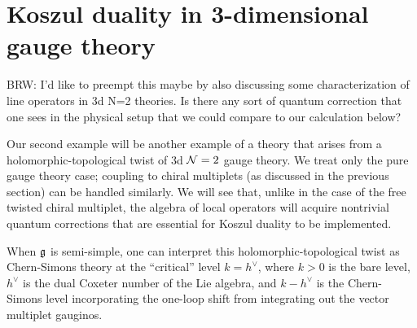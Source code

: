 \documentclass[11pt]{amsart}
\def\brian#1{{\textcolor{blue!65!red}{BRW: {#1}}}}
\begin{document}
%
%
%
%
%
%


\section{Koszul duality in 3-dimensional gauge theory}\label{s:crit}

\brian{I'd like to preempt this maybe by also discussing some characterization of line operators in 3d N=2 theories. 
Is there any sort of quantum correction that one sees in the physical setup that we could compare to our calculation below?}

Our second example will be another example of a theory that arises from a holomorphic-topological twist of 3d $\mathcal N=2$ gauge theory. 
We treat only the pure gauge theory case; coupling to chiral multiplets (as discussed in the previous section) can be handled similarly. 
We will see that, unlike in the case of the free twisted chiral multiplet, the algebra of local operators will acquire nontrivial quantum corrections that are essential for Koszul duality to be implemented. 

When $\mathfrak g$ is semi-simple, one can interpret this holomorphic-topological twist as Chern-Simons theory at the ``critical'' level $k = h^{\vee}$, where $k > 0$ is the bare level, $h^{\vee}$ is the dual Coxeter number of the Lie algebra, and $k - h^{\vee}$ is the Chern-Simons level incorporating the one-loop shift from integrating out the vector multiplet gauginos. 
\end{document}
